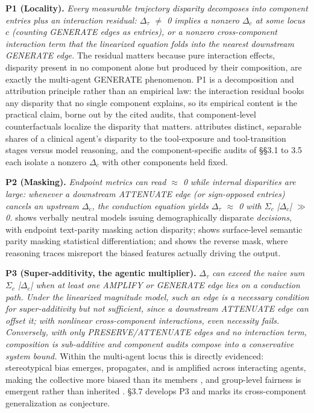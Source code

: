 \documentclass[acmsmall,nonacm]{acmart}
\begin{document}
\textbf{P1 (Locality).} \emph{Every measurable trajectory disparity decomposes into component entries plus an interaction residual: $\Delta_\tau$ $\neq$ 0 implies a nonzero $\Delta_c$ at some locus $c$ (counting GENERATE edges as entries), or a nonzero cross-component interaction term that the linearized equation folds into the nearest downstream GENERATE edge.} The residual matters because pure interaction effects, disparity present in no component alone but produced by their composition, are exactly the multi-agent GENERATE phenomenon. P1 is a decomposition and attribution principle rather than an empirical law: the interaction residual books any disparity that no single component explains, so its empirical content is the practical claim, borne out by the cited audits, that component-level counterfactuals localize the disparity that matters. \cite{xu2026ducx} attributes distinct, separable shares of a clinical agent's disparity to the tool-exposure and tool-transition stages versus model reasoning, and the component-specific audits of \S{}\S{}3.1 to 3.5 each isolate a nonzero $\Delta_c$ with other components held fixed.

\textbf{P2 (Masking).} \emph{Endpoint metrics can read $\approx$ 0 while internal disparities are large: whenever a downstream ATTENUATE edge (or sign-opposed entries) cancels an upstream $\Delta_c$, the conduction equation yields $\Delta_\tau$ $\approx$ 0 with $\Sigma_c$ |$\Delta_c$| $\gg$ 0.} \cite{li2025actions} shows verbally neutral models issuing demographically disparate \emph{decisions}, with endpoint text-parity masking action disparity; \cite{xu2025quantifying} shows surface-level semantic parity masking statistical differentiation; and \cite{turpin2023language} shows the reverse mask, where reasoning traces misreport the biased features actually driving the output.

\textbf{P3 (Super-additivity, the agentic multiplier).} \emph{$\Delta_\tau$ can exceed the naive sum $\Sigma_c$ |$\Delta_c$| when at least one AMPLIFY or GENERATE edge lies on a conduction path. Under the linearized magnitude model, such an edge is a necessary condition for super-additivity but not sufficient, since a downstream ATTENUATE edge can offset it; with nonlinear cross-component interactions, even necessity fails. Conversely, with only PRESERVE/ATTENUATE edges and no interaction term, composition is sub-additive and component audits compose into a conservative system bound.} Within the multi-agent locus this is directly evidenced: stereotypical bias emerges, propagates, and is amplified across interacting agents, making the collective more biased than its members \cite{nguyen2025social}, and group-level fairness is emergent rather than inherited \cite{madigan2025emergent}. \S{}3.7 develops P3 and marks its cross-component generalization as conjecture.
\end{document}
